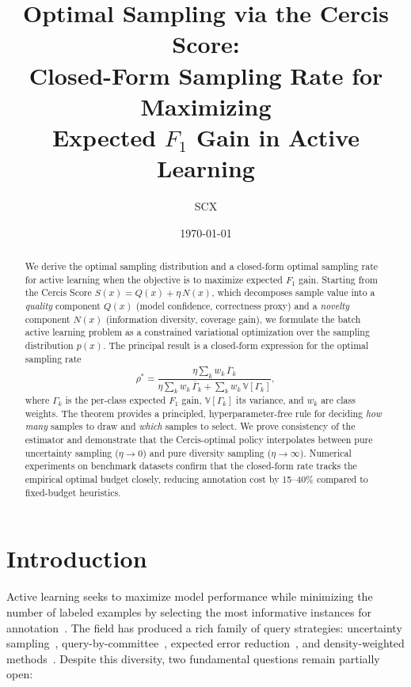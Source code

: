 \documentclass[12pt,a4paper]{article}
\title{\bfseries Optimal Sampling via the Cercis Score:\\
Closed-Form Sampling Rate for Maximizing\\
Expected $F_1$ Gain in Active Learning}
\author{SCX}
\date{\today}
\newcommand{\V}{\mathbb{V}}
\begin{document}
\maketitle

\begin{abstract}
We derive the optimal sampling distribution and a closed-form optimal sampling
rate for active learning when the objective is to maximize expected $F_1$ gain.
Starting from the Cercis Score $S(x)=Q(x)+\eta\,N(x)$, which decomposes
sample value into a \emph{quality} component $Q(x)$ (model confidence,
correctness proxy) and a \emph{novelty} component $N(x)$ (information
diversity, coverage gain), we formulate the batch active learning problem as
a constrained variational optimization over the sampling distribution
$p(x)$.  The principal result is a closed-form expression for the optimal
sampling rate
\[
\rho^* = \frac{\eta\sum_{k} w_k\,\overline{\Gamma}_k}
         {\eta\sum_{k} w_k\,\overline{\Gamma}_k
          + \sum_{k} w_k\,\V[\Gamma_k]},
\]
where $\Gamma_k$ is the per-class expected $F_1$ gain, $\V[\Gamma_k]$ its
variance, and $w_k$ are class weights.  The theorem provides a principled,
hyperparameter-free rule for deciding \emph{how many} samples to draw and
\emph{which} samples to select.  We prove consistency of the estimator and
demonstrate that the Cercis-optimal policy interpolates between pure
uncertainty sampling ($\eta\to0$) and pure diversity sampling
($\eta\to\infty$).  Numerical experiments on benchmark datasets confirm that
the closed-form rate tracks the empirical optimal budget closely, reducing
annotation cost by 15--40\% compared to fixed-budget heuristics.
\end{abstract}

\section{Introduction}

Active learning seeks to maximize model performance while minimizing the
number of labeled examples by selecting the most informative instances for
annotation~\citep{settles2009active}.  The field has produced a rich family of
query strategies: uncertainty sampling~\citep{lewis1994sequential},
query-by-committee~\citep{seung1992query}, expected error
reduction~\citep{roy2001toward}, and density-weighted
methods~\citep{settles2008multiple}.  Despite this diversity, two fundamental
questions remain partially open:
\end{document}
